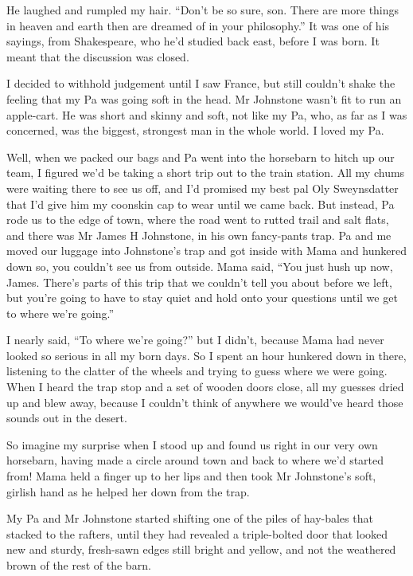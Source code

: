 He laughed and rumpled my hair.
``Don't be so sure, son. There are more things in heaven and earth then are 
dreamed of in your philosophy.''
It was one of his sayings, from Shakespeare, who he'd studied back
east, before I was born. It meant that the discussion was closed.

I decided to withhold judgement until I saw France, but still
couldn't shake the feeling that my Pa was going soft in the head.
Mr Johnstone wasn't fit to run an apple-cart. He was short and
skinny and soft, not like my Pa, who, as far as I was concerned,
was the biggest, strongest man in the whole world. I loved my Pa.

\tb

Well, when we packed our bags and Pa went into the horsebarn to
hitch up our team, I figured we'd be taking a short trip out to the
train station. All my chums were waiting there to see us off, and
I'd promised my best pal Oly Sweynsdatter that I'd give him my
coonskin cap to wear until we came back. But instead, Pa rode us to
the edge of town, where the road went to rutted trail and salt
flats, and there was Mr James H Johnstone, in his own fancy-pants
trap. Pa and me moved our luggage into Johnstone's trap and got
inside with Mama and hunkered down so, you couldn't see us from
outside. Mama said,
``You just hush up now, James. There's parts of this trip that we couldn't tell 
you about before we left, but you're going to have to stay quiet and hold onto 
your questions until we get to where we're going.''

I nearly said, ``To where we're going?'' but I didn't, because Mama
had never looked so serious in all my born days. So I spent an hour
hunkered down in there, listening to the clatter of the wheels and
trying to guess where we were going. When I heard the trap stop and
a set of wooden doors close, all my guesses dried up and blew away,
because I couldn't think of anywhere we would've heard those sounds
out in the desert.

So imagine my surprise when I stood up and found us right in our
very own horsebarn, having made a circle around town and back to
where we'd started from! Mama held a finger up to her lips and then
took Mr Johnstone's soft, girlish hand as he helped her down from
the trap.

My Pa and Mr Johnstone started shifting one of the piles of
hay-bales that stacked to the rafters, until they had revealed a
triple-bolted door that looked new and sturdy, fresh-sawn edges
still bright and yellow, and not the weathered brown of the rest of
the barn.

